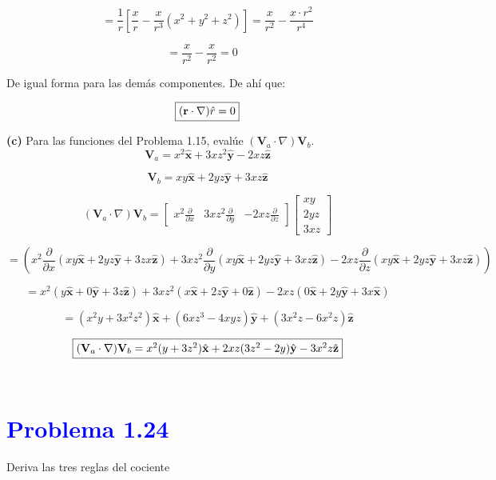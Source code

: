 \documentclass[12pt]{article}
\newcommand{\question}[1]{\textcolor{blue}{\textbf{#1}}}
\begin{document}
\[
= \frac{1}{r} \left[ \frac{x}{r} -  \frac{x}{r^3} (x^2 + y^2 + z^2) \right] = \frac{x}{r^2} - \frac{x \cdot r^2}{r^4} 
\]

\[
= \frac{x}{r^2} - \frac{x}{r^2} = 0 \quad 
\]

De igual forma para las demás componentes.  
De ahí que:

\[ \fbox{$
(\mathbf{r} \cdot \nabla) \hat{r} = 0 $} 
\]

\textbf{(c)} Para las funciones del Problema 1.15, evalúe \( (\mathbf{V}_a \cdot \nabla) \mathbf{V}_b \).
\[
\mathbf{V}_a = x^2 \hat{\mathbf{x}} + 3xz^2 \hat{\mathbf{y}} - 2xz \hat{\mathbf{z}}
\]

\[
\mathbf{V}_b = xy \hat{\mathbf{x}} + 2yz \hat{\mathbf{y}} + 3xz \hat{\mathbf{z}}
\]

\[
(\mathbf{V}_a \cdot \nabla) \mathbf{V}_b =
\begin{bmatrix}
x^2 \frac{\partial}{\partial x} & 3x z^2 \frac{\partial}{\partial y} & -2xz \frac{\partial}{\partial z}
\end{bmatrix}
\begin{bmatrix}
xy \\ 2yz \\ 3xz
\end{bmatrix}
\]

\[
= \left( x^2 \frac{\partial}{\partial x} (xy \hat{\mathbf{x}} + 2yz \hat{\mathbf{y}} + 3zx \hat{\mathbf{z}} ) + 3xz^2 \frac{\partial}{\partial y} (xy \hat{\mathbf{x}} + 2yz \hat{\mathbf{y}}+ 3xz \hat{\mathbf{z}})- 2xz \frac{\partial}{\partial z} (xy \hat{\mathbf{x}}+ 2yz \hat{\mathbf{y}} + 3xz \hat{\mathbf{z}})\right) 
\]

\[
= x^2 \left( y \hat{\mathbf{x}}+ 0\hat{\mathbf{y}} + 3z\hat{\mathbf{z}} \right)  + 3xz^2 \left( x\hat{\mathbf{x}} + 2z\hat{\mathbf{y}} + 0\hat{\mathbf{z}} \right)- 2xz \left( 0\hat{\mathbf{x}} + 2y \hat{\mathbf{y}}+ 3x \hat{\mathbf{x}}\right)
\]

\[
= \left( x^2 y + 3x^2 z^2 \right) \hat{\mathbf{x}} + \left( 6xz^3 - 4xyz \right) \hat{\mathbf{y}} + \left( 3x^2 z - 6x^2 z \right) \hat{\mathbf{z}}
\]

\[\fbox{$
(\mathbf{V}_a \cdot \nabla) \mathbf{V}_b = x^2 (y + 3z^2) \hat{\mathbf{x}} + 2xz (3z^2 - 2y) \hat{\mathbf{y}} - 3x^2 z \hat{\mathbf{z}}
$}\]\\

\section*{\question{Problema 1.24}} Deriva las tres reglas del cociente
\end{document}
